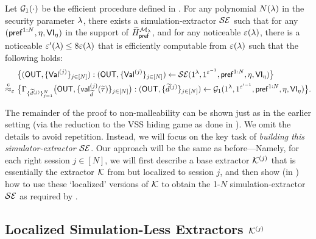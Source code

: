 \begin{lemma}\label{lem:simext:closeness:1-many}
    Let $\mathcal{G}_1(\cdot)$ be the efficient procedure defined in . For any polynomial $N(\lambda)$ in the security parameter $\lambda$, there exists a simulation-extractor $\mathcal{SE}$ such that for any $(\mathsf{pref}^{1:N},\eta,\mathsf{VI}_\eta)$ in the support of $\widetilde{H}^{\mathcal{M}_\lambda}_\mathsf{pref}$, and for any noticeable $\varepsilon(\lambda)$, there is a noticeable $\varepsilon'(\lambda) \le 8\varepsilon(\lambda)$ that is efficiently computable from $\varepsilon(\lambda)$ such that the following holds:
    \begin{align*}
        &
        \big\{(\mathsf{OUT}, \{\mathsf{Val}^{(j)}\}_{j \in [N]}): (\mathsf{OUT}, \{\mathsf{Val}^{(j)}\}_{j \in [N]}) \gets \mathcal{SE}(1^\lambda, 1^{\varepsilon^{-1}},\mathsf{pref}^{1:N},\eta,\mathsf{VI}_\eta) \big\}
        \\
        \stackrel{\text{c}}{\approx}_{\varepsilon} 
        ~&
        \big\{\Gamma_{\{\widetilde{d}^{(j)}\}_{j=1}^{N}}\big(\mathsf{OUT}, \{\mathsf{val}^{(j)}_{\widetilde{d}}(\widetilde{\tau})\}_{j \in [N]}\big): (\mathsf{OUT}, \{\widetilde{d}^{(j)}\}_{j \in [N]}) \gets \mathcal{G}_1(1^\lambda, 1^{\varepsilon'^{-1}}, \mathsf{pref}^{1:N},\eta,\mathsf{VI}_\eta) \big\}.
    \end{align*}
\end{lemma} 

The remainder of the proof to non-malleability can be shown just as in the earlier setting (via the reduction to the VSS hiding game as done in ). We omit the details to avoid repetition. Instead, we will focus on the key task of {\em building this simulator-extractor $\mathcal{SE}$}. Our approach will be the same as before---Namely, for each right session $j \in [N]$, we will first describe a base extractor $\mathcal{K}^{(j)}$ that is essentially the extractor $\mathcal{K}$ from  but localized to session $j$, and then show (in ) how to use these `localized' versions of $\mathcal{K}$ to obtain the 1-$N$ simulation-extractor $\mathcal{SE}$ as required by .


\subsection{Localized Simulation-Less Extractors $\mathcal{K}^{(j)}$}



